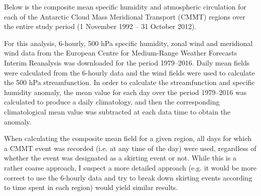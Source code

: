 Below is the composite mean specific humidity and atmospheric circulation for each of the Antarctic Cloud Mass Meridional Transport (CMMT) regions over the entire study period (1 November 1992 -- 31 October 2012).

For this analysis, 6-hourly, 500 hPa specific humidity, zonal wind and meridional wind data from the European Centre for Medium-Range Weather Forecasts Interim Reanalysis \citep[ERA-Interim;][]{Dee2011} was downloaded for the period 1979--2016. Daily mean fields were calculated from the 6-hourly data and the wind fields were used to calculate the 500 hPa streamfunction. In order to calculate the streamfunction and specific humidity anomaly, the mean value for each day over the period 1979--2016 was calculated to produce a daily climatology, and then the corresponding climatological mean value was subtracted at each data time to obtain the anomaly.   

When calculating the composite mean field for a given region, all days for which a CMMT event was recorded (i.e. at any time of the day) were used, regardless of whether the event was designated as a skirting event or not. While this is a rather coarse approach, I suspect a more detailed approach (e.g. it would be more correct to use the 6-hourly data and try to break down skirting events according to time spent in each region) would yield similar results.

